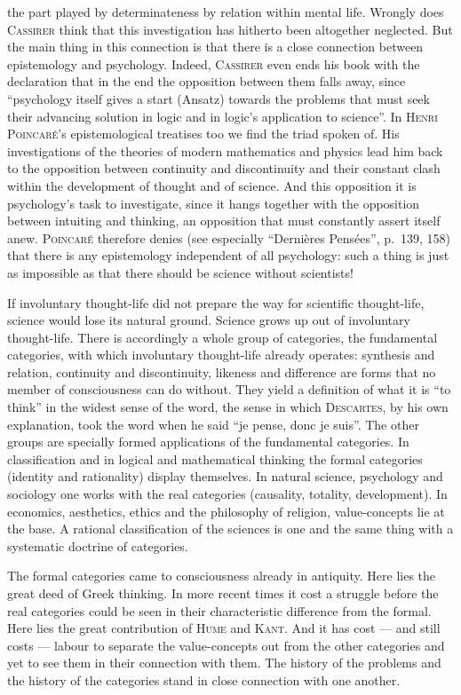 \documentclass[12pt]{book}
\begin{document}
the part played by determinateness by relation within mental life. Wrongly does
\textsc{Cassirer} think that this investigation has hitherto been altogether
neglected. But the main thing in this connection is that there is a close
connection between epistemology and psychology. Indeed, \textsc{Cassirer} even
ends his book with the declaration that in the end the opposition between them
falls away, since ``psychology itself gives a start (Ansatz) towards the
problems that must seek their advancing solution in logic and in logic's
application to science''. In \textsc{Henri Poincaré}'s epistemological treatises
too we find the triad spoken of. His investigations of the theories of modern
mathematics and physics lead him back to the opposition between continuity and
discontinuity and their constant clash within the development of thought and of
science. And this opposition it is psychology's task to investigate, since it
hangs together with the opposition between intuiting and thinking, an opposition
that must constantly assert itself anew. \textsc{Poincaré} therefore denies (see
especially ``Dernières Pensées'', p.\ 139, 158) that there is any epistemology
independent of all psychology: such a thing is just as impossible as that there
should be science without scientists!

If involuntary thought-life did not prepare the way for scientific thought-life,
science would lose its natural ground. Science grows up out of involuntary
thought-life. There is accordingly a whole group of categories, the fundamental
categories, with which involuntary thought-life already operates: synthesis and
relation, continuity and discontinuity, likeness and difference are forms that
no member of consciousness can do without. They yield a definition of what it is
``to think'' in the widest sense of the word, the sense in which
\textsc{Descartes}, by his own explanation, took the word when he said ``je
pense, donc je suis''. The other groups are specially formed applications of the
fundamental categories. In classification and in logical and mathematical
thinking the formal categories (identity and rationality) display themselves. In
natural science, psychology and sociology one works with the real categories
(causality, totality, development). In economics, aesthetics, ethics and the
philosophy of religion, value-concepts lie at the base. A rational
classification of the sciences is one and the same thing with a systematic
doctrine of categories.

The formal categories came to consciousness already in antiquity. Here lies the
great deed of Greek thinking. In more recent times it cost a struggle before the
real categories could be seen in their characteristic difference from the
formal. Here lies the great contribution of \textsc{Hume} and \textsc{Kant}. And
it has cost --- and still costs --- labour to separate the value-concepts out
from the other categories and yet to see them in their connection with them. The
history of the problems and the history of the categories stand in close
connection with one another.
\end{document}
